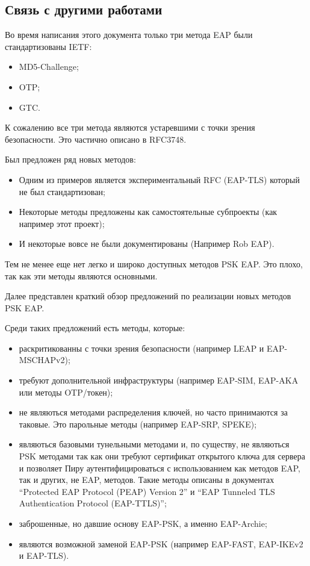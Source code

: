 \subsection{Связь с другими работами}

Во время написания этого документа только три метода EAP были стандартизованы IETF:

\begin{itemize}
\item MD5-Challenge;
\item OTP;
\item GTC.
\end{itemize}

К сожалению все три метода являются устаревшими с точки зрения безопасности. Это частично описано в RFC3748.

Был предложен ряд новых методов:

\begin{itemize}
\item Одним из примеров является экспериментальный RFC (EAP-TLS) который не был стандартизован;
\item Некоторые методы предложены как самостоятельные субпроекты (как например этот проект);
\item И некоторые вовсе не были документированы (Например Rob EAP).
\end{itemize}

Тем не менее еще нет легко и широко доступных методов PSK EAP. Это плохо, так как эти методы являются основными.

Далее представлен краткий обзор предложений по реализации новых методов PSK EAP.

Среди таких предложений есть методы, которые:

\begin{itemize}
\item раскритикованны с точки зрения безопасности (например LEAP и EAP-MSCHAPv2);
\item требуют дополнительной инфраструктуры (например EAP-SIM, EAP-AKA или методы OTP/токен);
\item не являються методами распределения ключей, но часто принимаются за таковые. Это парольные методы (например EAP-SRP, SPEKE);
\item являються базовыми тунельными методами и, по существу, не являються PSK методами так как они требуют сертификат открытого ключа для сервера и позволяет Пиру аутентифицироваться с использованием как методов EAP, так и других, не EAP, методов. Такие методы описаны в документах ``Protected EAP Protocol (PEAP) Version 2'' и ``EAP Tunneled TLS Authentication Protocol (EAP-TTLS)'';
\item заброшенные, но давшие основу EAP-PSK, а именно EAP-Archie;
\item являются возможной заменой EAP-PSK (например EAP-FAST, EAP-IKEv2 и EAP-TLS). 
\end{itemize}

